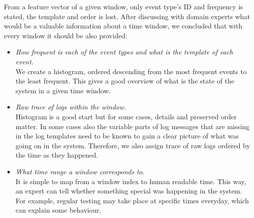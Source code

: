 From a feature vector of a given window, only event type's ID and frequency is stated, the template and order is lost.
After discussing with domain experts what would be a valuable information about a time window, we concluded that with every window it should be also provided:
\begin{itemize}
    \item \textit{How frequent is each of the event types and what is the template of each event.}\\
    We create a histogram, ordered descending from the most frequent events to the least frequent. This gives a good overview of what is the state of the system in a given time window. 
    \item \textit{Raw trace of logs within the window.}\\
    Histogram is a good start but for some cases, details and preserved order matter. In some cases also the variable parts of log messages that are missing in the log templates need to be known to gain a clear picture of what was going on in the system. Therefore, we also assign trace of raw logs ordered by the time as they happened.
    \item \textit{What time range a window corresponds to.}\\
    It is simple to map from a window index to human readable time. This way, an expert can tell whether something special was happening in the system. For example, regular testing may take place at specific times everyday, which can explain some behaviour.
\end{itemize}
 

